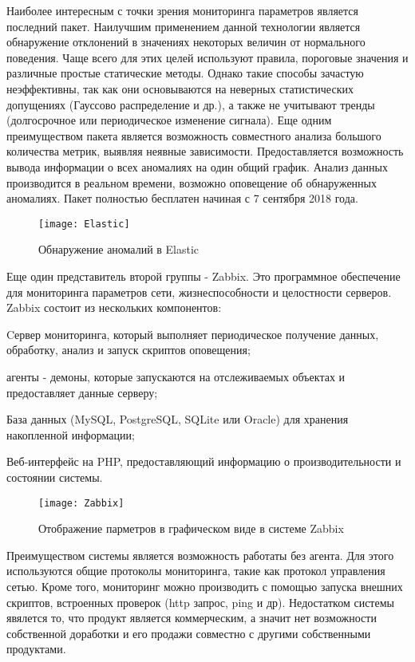 Наиболее интересным с точки зрения мониторинга параметров является последний пакет. Наилучшим применением данной технологии является обнаружение отклонений в значениях некоторых величин от нормального поведения. Чаще всего для этих целей используют правила, пороговые значения и различные простые статические методы. Однако такие способы зачастую неэффективны, так как они основываются на неверных статистических допущениях (Гауссово распределение и др.), а также не учитывают тренды (долгосрочное или периодическое изменение сигнала). Еще одним преимуществом пакета является возможность совместного анализа большого количества метрик, выявляя неявные зависимости. Предоставляется возможность вывода информации о всех аномалиях на один общий график. Анализ данных производится в реальном времени, возможно оповещение об обнаруженных аномалиях. Пакет полностью бесплатен начиная с 7 сентября 2018 года. 


\begin{figure}[htbp]
	\centering
	\texttt{[image: Elastic]}
	\caption{Обнаружение аномалий в Elastic}
	\label{fig:Elastic}
\end{figure}

Еще один представитель второй группы - Zabbix. Это программное обеспечение для мониторинга параметров сети, жизнеспособности и целостности серверов. Zabbix состоит из нескольких компонентов:
\begin{itemize*}
	\item{Cервер мониторинга, который выполняет периодическое получение данных, обработку, анализ и запуск скриптов оповещения;}
	\item{агенты - демоны, которые запускаются на отслеживаемых объектах и предоставляет данные серверу;}
	\item{База данных (MySQL, PostgreSQL, SQLite или Oracle) для хранения накопленной информации;}
	\item{Веб-интерфейс на PHP, предоставляющий информацию о производительности и состоянии системы.}
\end{itemize*}

\begin{figure}[!htbp]
	\centering
	\texttt{[image: Zabbix]}
	\caption{Отображение парметров в графическом виде в системе Zabbix}
	\label{fig:Zabbix}
\end{figure}

Преимуществом системы является возможность работаты без агента. Для этого используются общие протоколы мониторинга, такие как протокол управления сетью.  Кроме того, мониторинг можно производить с помощью запуска внешних скриптов, встроенных проверок (http запрос, ping и др). Недостатком системы явялется то, что продукт является коммерческим, а значит нет возможности собственной доработки и его продажи совместно с другими собственными продуктами.  

